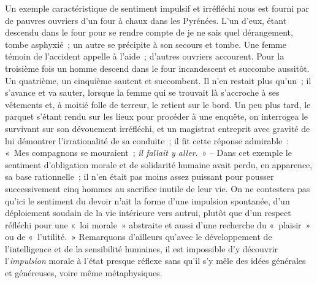 \documentclass[french,twoside]{book} %
\begin{document}
Un exemple caractéristique de sentiment impulsif et irréfléchi nous est fourni par de pauvres ouvriers d’un four à chaux dans les Pyrénées. L’un d’eux, étant descendu dans le four pour se rendre compte de je ne sais quel dérangement, tombe asphyxié ; un autre se précipite à son secours et tombe. Une femme témoin de l’accident appelle à l’aide ; d’autres ouvriers accourent. Pour la troisième fois un homme descend dans le four incandescent et succombe aussitôt. Un quatrième, un cinquième sautent et succombent. Il n’en restait plus qu’un ; il s’avance et va sauter, lorsque la femme qui se trouvait là s’accroche à ses vêtements et, à moitié folle de terreur, le retient sur le bord. Un peu plus tard, le parquet s’étant rendu sur les lieux pour procéder à une enquête, on interrogea le survivant sur son dévouement irréfléchi, et un magistrat entreprit avec gravité de lui démontrer l’irrationalité de sa conduite ; il fit cette réponse admirable : « Mes compagnons se mouraient ; \emph{il fallait y aller}. » – Dans cet exemple le sentiment d’obligation morale et de solidarité humaine avait perdu, en apparence, sa base rationnelle ; il n’en était pas moins assez puissant pour pousser successivement cinq hommes au sacrifice inutile de leur vie. On ne contestera pas qu’ici le sentiment du devoir n’ait la forme d’une impulsion spontanée, d’un déploiement soudain de la vie intérieure vers autrui, plutôt que d’un respect réfléchi pour une « loi morale » abstraite et aussi d’une recherche du « plaisir » ou de « l’utilité. » Remarquons d’ailleurs qu’avec le développement de l’intelligence et de la sensibilité humaines, il est impossible d’y découvrir l’\emph{impulsion} morale à l’état presque réflexe sans qu’il s’y mêle des idées générales et généreuses, voire même métaphysiques.\par
\end{document}
